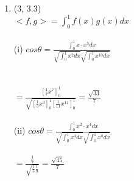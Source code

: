 \documentclass[letterpaper,12pt]{article}
\theoremstyle{definition}
\begin{document}
\begin{enumerate}
	\item (3, 3.3) \\
$<f,g> = \int_{0}^{1} f(x)g(x) dx$
\\
\\
(i) $cos \theta = \frac{\int_{0}^{1} x \cdot x^5 dx }{\sqrt{\int_{0}^{1} x^2 dx}\sqrt{\int_{0}^{1} x^{10} dx}} $ 
\\
\\
\\
$= \frac{[\frac{1}{7}x^7]_0^1}{\sqrt{[\frac{1}{3}x^3]_0^1 [\frac{1}{11} x^{11} ]_0^1}} = \frac{\sqrt{33}}{7}$
\\
\\
(ii) $cos \theta = \frac{\int_{0}^{1} x^2 \cdot x^4 dx }{\sqrt{\int_{0}^{1} x^4 dx}\sqrt{\int_{0}^{1} x^{8} dx}} $ 
\\
\\
$= \frac{\frac{1}{7}}{\sqrt{\frac{1}{5} \frac{1}{9}}} = \frac{\sqrt{45}}{7} $





\end{enumerate}
\end{document}
